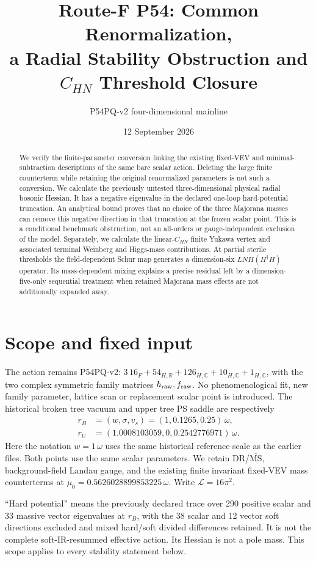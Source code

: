 \documentclass[11pt]{article}
\title{Route-F P54: Common Renormalization,\\
a Radial Stability Obstruction and $C_{HN}$ Threshold Closure}
\author{P54PQ-v2 four-dimensional mainline}
\date{12 September 2026}
\newcommand{\MS}{\overline{\mathrm{MS}}}
\newcommand{\LOOP}{\mathcal L}
\begin{document}
\maketitle
\begin{abstract}
We verify the finite-parameter conversion linking the existing fixed-VEV
and minimal-subtraction descriptions of the same bare scalar action.
Deleting the large finite counterterm while retaining the original
renormalized parameters is not such a conversion. We calculate the
previously untested three-dimensional physical radial bosonic Hessian.
It has a negative eigenvalue in the declared one-loop hard-potential
truncation. An analytical bound proves that no choice of the three
Majorana masses can remove this negative direction in that
truncation at the frozen scalar point. This is a conditional benchmark
obstruction, not an all-orders or gauge-independent exclusion of the model.
Separately, we calculate the linear-$C_{HN}$ finite Yukawa vertex and
associated terminal Weinberg and Higgs-mass contributions. At partial
sterile thresholds the field-dependent Schur map generates a dimension-six
$LNH(H^\dagger H)$ operator. Its mass-dependent mixing explains a precise
residual left by a dimension-five-only sequential treatment when retained
Majorana mass effects are not additionally expanded away.
\end{abstract}

\section{Scope and fixed input}
The action remains P54PQ-v2:
$3\,16_F+54_{H,\mathbb R}+126_{H,\mathbb C}+10_{H,\mathbb C}
+1_{H,\mathbb C}$, with the two complex symmetric family matrices
$h_{\rm raw},f_{\rm raw}$. No phenomenological fit, new family parameter,
lattice scan or replacement scalar point is introduced. The historical
broken tree vacuum and upper tree PS saddle are respectively
\begin{align}
 r_B&=(w,\sigma,v_s)=(1,0.1265,0.25)\,\omega,\\
 r_U&=(1.0008103059,0,0.2542776971)\,\omega.
\end{align}
Here the notation $w=1\,\omega$ uses the same historical reference scale
as the earlier files. Both points use the same scalar parameters.
We retain DR/$\MS$, background-field Landau gauge, and the existing
finite invariant fixed-VEV mass counterterms at
$\mu_0=0.5626028899853225\,\omega$. Write $\LOOP=16\pi^2$.

``Hard potential'' means the previously declared trace over 290 positive
scalar and 33 massive vector eigenvalues at $r_B$, with the 38 scalar
and 12 vector soft directions excluded and mixed hard/soft divided
differences retained. It is not the complete soft-IR-resummed effective
action. Its Hessian is not a pole mass. This scope applies to every
stability statement below.
\end{document}
